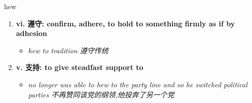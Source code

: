 
\begin{frame}
{\huge hew}
\begin{center}
\begin{enumerate}\Large
  \item \textbf{vi. 遵守: confirm, adhere, to hold to something firmly as if by adhesion}
  \begin{itemize}
    \item \em{\Large{hew to tradition 遵守传统}}
  \end{itemize}
  \item \textbf{v. 支持: to give steadfast support to}
  \begin{itemize}
    \item \em{\Large{no longer was able to hew to the party line and so he switched political parties 不再赞同该党的纲领,他投奔了另一个党}}
  \end{itemize}
\end{enumerate}
\end{center}
\end{frame}
